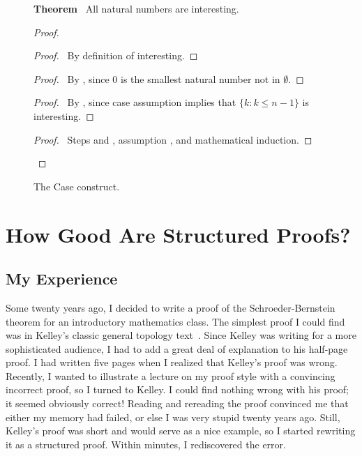 \begin{figure}
\small
{\bf Theorem} \ All natural numbers are interesting.
\begin{proof}
  \begin{proof}
    \pf\ By definition of interesting.
  \end{proof}
  \begin{proof}
  \pf\ By , since $0$ is the smallest natural number not in 
    $\emptyset$.
  \end{proof}
  \begin{proof}
   \pf\ By , since case assumption  
   implies that $\{k : k \leq n-1\}$ is interesting.
  \end{proof}
\qedstep
\begin{proof}
\pf\ Steps  and , assumption ,
 and mathematical induction.
\end{proof}
\end{proof}
\normalsize
\caption{The {\sc Case} construct.}
\label{fig:case}
\end{figure}

\section{How Good Are Structured Proofs?}

\subsection{My Experience}

Some twenty years ago, I decided to write a proof of the
Schroeder-Bernstein theorem for an introductory mathematics class.
The simplest proof I could find was in Kelley's classic general
topology text~\cite[page 28]{kelley:general}.  Since Kelley was
writing for a more sophisticated audience, I had to add a great deal
of explanation to his half-page proof.  I had written five pages when
I realized that Kelley's proof was wrong.  Recently, I wanted to
illustrate a lecture on my proof style with a convincing incorrect
proof, so I turned to Kelley.  I could find nothing wrong with his
proof; it seemed obviously correct! Reading and rereading the proof
convinced me that either my memory had failed, or else I was very
stupid twenty years ago.  Still, Kelley's proof was short and would
serve as a nice example, so I started rewriting it as a structured
proof.  Within minutes, I rediscovered the error.

